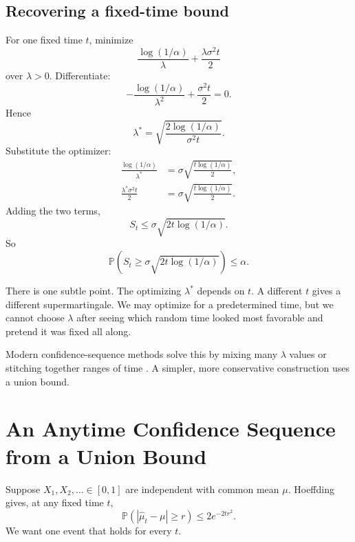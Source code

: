 \documentclass[en,nofont,11pt]{elegantbook}
\newcommand{\Pbb}{\mathbb{P}}
\begin{document}
\section{Recovering a fixed-time bound}

For one fixed time $t$, minimize
\[
\frac{\log(1/\alpha)}{\lambda}
+
\frac{\lambda\sigma^2t}{2}
\]
over $\lambda>0$. Differentiate:
\[
-\frac{\log(1/\alpha)}{\lambda^2}
+
\frac{\sigma^2t}{2}
=0.
\]
Hence
\[
\lambda^*
=
\sqrt{
\frac{2\log(1/\alpha)}{\sigma^2t}
}.
\]
Substitute the optimizer:
\begin{align*}
\frac{\log(1/\alpha)}{\lambda^*}
&=
\sigma\sqrt{\frac{t\log(1/\alpha)}{2}},\\
\frac{\lambda^*\sigma^2t}{2}
&=
\sigma\sqrt{\frac{t\log(1/\alpha)}{2}}.
\end{align*}
Adding the two terms,
\[
S_t
\le
\sigma\sqrt{2t\log(1/\alpha)}.
\]
So
\[
\Pbb\left(
S_t\ge\sigma\sqrt{2t\log(1/\alpha)}
\right)
\le\alpha.
\]

There is one subtle point. The optimizing $\lambda^*$ depends on $t$. A different $t$ gives a different supermartingale. We may optimize for a predetermined time, but we cannot choose $\lambda$ after seeing which random time looked most favorable and pretend it was fixed all along.

Modern confidence-sequence methods solve this by mixing many $\lambda$ values or stitching together ranges of time \cite{howard2020timeuniform,howard2021confidence}. A simpler, more conservative construction uses a union bound.

\chapter{An Anytime Confidence Sequence from a Union Bound}

Suppose $X_1,X_2,\ldots\in[0,1]$ are independent with common mean $\mu$. Hoeffding gives, at any fixed time $t$,
\[
\Pbb\left(
|\widehat\mu_t-\mu|\ge r
\right)
\le
2e^{-2tr^2}.
\]
We want one event that holds for every $t$.
\end{document}

